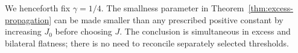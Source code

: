 We henceforth fix $\gamma=1/4$. The smallness parameter in
Theorem~\ref{thm:excess-propagation} can be made smaller than any
prescribed positive constant by increasing $J_0$ before choosing $J$.
The conclusion is simultaneous in excess and bilateral flatness;
there is no need to reconcile separately selected thresholds.

